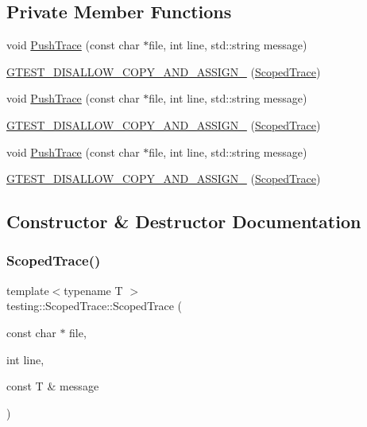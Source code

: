\subsection*{Private Member Functions}
\begin{DoxyCompactItemize}
\item 
void \mbox{\hyperlink{classtesting_1_1_scoped_trace_a905304c342012d6ae1493a1ad3b62255}{Push\+Trace}} (const char $\ast$file, int line, std\+::string message)
\item 
\mbox{\hyperlink{classtesting_1_1_scoped_trace_aed447fe36b38f99ace904ed52c206eb0}{G\+T\+E\+S\+T\+\_\+\+D\+I\+S\+A\+L\+L\+O\+W\+\_\+\+C\+O\+P\+Y\+\_\+\+A\+N\+D\+\_\+\+A\+S\+S\+I\+G\+N\+\_\+}} (\mbox{\hyperlink{classtesting_1_1_scoped_trace}{Scoped\+Trace}})
\item 
void \mbox{\hyperlink{classtesting_1_1_scoped_trace_a905304c342012d6ae1493a1ad3b62255}{Push\+Trace}} (const char $\ast$file, int line, std\+::string message)
\item 
\mbox{\hyperlink{classtesting_1_1_scoped_trace_aed447fe36b38f99ace904ed52c206eb0}{G\+T\+E\+S\+T\+\_\+\+D\+I\+S\+A\+L\+L\+O\+W\+\_\+\+C\+O\+P\+Y\+\_\+\+A\+N\+D\+\_\+\+A\+S\+S\+I\+G\+N\+\_\+}} (\mbox{\hyperlink{classtesting_1_1_scoped_trace}{Scoped\+Trace}})
\item 
void \mbox{\hyperlink{classtesting_1_1_scoped_trace_a905304c342012d6ae1493a1ad3b62255}{Push\+Trace}} (const char $\ast$file, int line, std\+::string message)
\item 
\mbox{\hyperlink{classtesting_1_1_scoped_trace_aed447fe36b38f99ace904ed52c206eb0}{G\+T\+E\+S\+T\+\_\+\+D\+I\+S\+A\+L\+L\+O\+W\+\_\+\+C\+O\+P\+Y\+\_\+\+A\+N\+D\+\_\+\+A\+S\+S\+I\+G\+N\+\_\+}} (\mbox{\hyperlink{classtesting_1_1_scoped_trace}{Scoped\+Trace}})
\end{DoxyCompactItemize}


\subsection{Constructor \& Destructor Documentation}
\mbox{\label{classtesting_1_1_scoped_trace_a2da90b95d682d518cca472934d53c59c}} 
\subsubsection{\texorpdfstring{ScopedTrace()}{ScopedTrace()}\hspace{0.1cm}{\footnotesize\ttfamily [1/9]}}
{\footnotesize\ttfamily template$<$typename T $>$ \\
testing\+::\+Scoped\+Trace\+::\+Scoped\+Trace (\begin{DoxyParamCaption}\item[{const char $\ast$}]{file,  }\item[{int}]{line,  }\item[{const T \&}]{message }\end{DoxyParamCaption})\hspace{0.3cm}{\ttfamily [inline]}}

